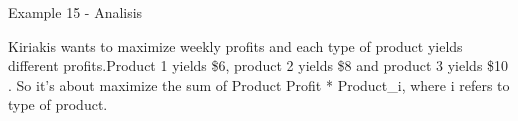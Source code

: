 \begin{frame}{Example 15 - Analisis}

Kiriakis wants to maximize weekly profits and each type of product
yields different profits.Product 1 yields \$6, product 2 yields \$8 and
product 3 yields \$10 . So it's about maximize the sum of
Product Profit * Product\_i, where i refers to type of product.
\end{frame}
